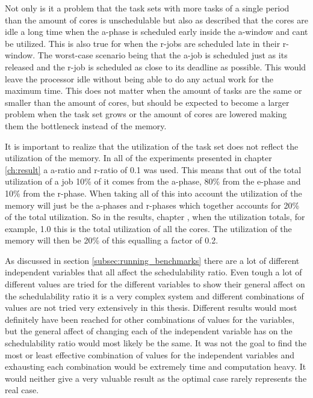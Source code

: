 \documentclass{kththesis}
\begin{document}
Not only is it a problem that the task sets with more tasks of a single period than the amount of
cores is unschedulable but also as described that the cores are idle a long time when the
\acrshort{a}-phase is scheduled early inside the \acrshort{a}-window and cant be utilized. This is
also true for when the \acrshort{r}-jobs are scheduled late in their \acrshort{r}-window. The
worst-case scenario being that the \acrshort{a}-job is scheduled just as its released and the
\acrshort{r}-job is scheduled as close to its deadline as possible. This would leave the processor
idle without being able to do any actual work for the maximum time. This does not matter when the
amount of tasks are the same or smaller than the amount of cores, but should be expected to become a
larger problem when the task set grows or the amount of cores are lowered making them the bottleneck
instead of the memory.

It is important to realize that the utilization of the task set does not reflect the utilization of
the memory. In all of the experiments presented in chapter \ref{ch:result} a \acrshort{a}-ratio and
\acrshort{r}-ratio of 0.1 was used. This means that out of the total utilization of a job 10\% of it
comes from the \acrshort{a}-phase, 80\% from the \acrshort{e}-phase and 10\% from the
\acrshort{r}-phase. When taking all of this into account the utilization of the memory will just be
the \acrshort{a}-phases and \acrshort{r}-phases which together accounts for 20\% of the total
utilization. So in the results, chapter \label{ch:results}, when the utilization totals, for
example, 1.0 this is the total utilization of all the cores. The utilization of the memory will then
be 20\% of this equalling a factor of 0.2.

As discussed in section \ref{subsec:running_benchmarks} there are a lot of different independent
variables that all affect the schedulability ratio. Even tough a lot of different values are tried
for the different variables to show their general affect on the schedulability ratio it is a very
complex system and different combinations of values are not tried very extensively in this thesis.
Different results would most definitely have been reached for other combinations of values for the
variables, but the general affect of changing each of the independent variable has on the
schedulability ratio would most likely be the same. It was not the goal to find the most or least
effective combination of values for the independent variables and exhausting each combination would
be extremely time and computation heavy. It would neither give a very valuable result as the optimal
case rarely represents the real case.
\end{document}
